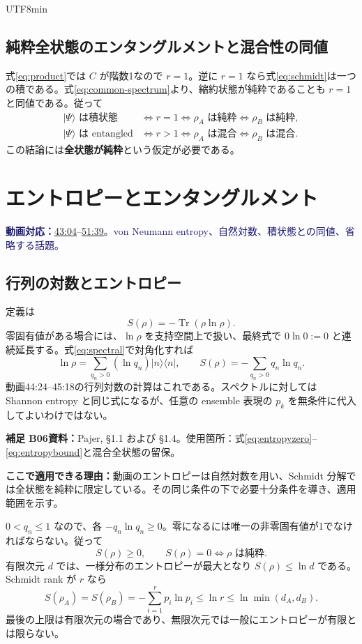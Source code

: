 \documentclass[11pt,a4paper]{article}
\numberwithin{equation}{section}
\newcommand{\Tr}{\operatorname{Tr}}
\newcommand{\ket}[1]{\lvert#1\rangle}
\newcommand{\bra}[1]{\langle#1\rvert}
\newcommand{\vid}[2]{\href{https://www.youtube.com/watch?v=3gDSaNy1O7Y\&t=#1s}{#2}}
\newcommand{\source}[1]{\par\noindent\textcolor{MidnightBlue}{\textbf{動画対応：}#1}\par}
\newcommand{\supp}[3]{\par\smallskip\noindent\textcolor{BrickRed}{\textbf{補足 #1}}\quad\textbf{資料：}#2\par\noindent\textbf{ここで適用できる理由：}#3\par}
\begin{document}
\begin{CJK*}{UTF8}{min}
\subsection{純粋全状態のエンタングルメントと混合性の同値}
式\eqref{eq:product}では $C$ が階数1なので $r=1$。逆に $r=1$ なら式\eqref{eq:schmidt}は一つの積である。式\eqref{eq:common-spectrum}より、縮約状態が純粋であることも $r=1$ と同値である。従って
\begin{equation}
\begin{split}
\ket{\Psi}\text{ は積状態}
&\Longleftrightarrow r=1
\Longleftrightarrow\rho_A\text{ は純粋}
\Longleftrightarrow\rho_B\text{ は純粋},\\
\ket{\Psi}\text{ は entangled}
&\Longleftrightarrow r>1
\Longleftrightarrow\rho_A\text{ は混合}
\Longleftrightarrow\rho_B\text{ は混合}.
\end{split}
\label{eq:entmixed}
\end{equation}
この結論には\textbf{全状態が純粋}という仮定が必要である。

\section{エントロピーとエンタングルメント}
\label{sec:entropy}
\source{\vid{2584}{43:04}--\vid{3099}{51:39}。von Neumann entropy、自然対数、積状態との同値、省略する話題。}
\subsection{行列の対数とエントロピー}
定義は
\begin{equation}
S(\rho)=-\Tr(\rho\ln\rho).
\label{eq:vn}
\end{equation}
零固有値がある場合には、$\ln\rho$ を支持空間上で扱い、最終式で $0\ln0:=0$ と連続延長する。式\eqref{eq:spectral}で対角化すれば
\begin{equation}
\ln\rho=\sum_{q_n>0}(\ln q_n)\ket{n}\bra{n},
\qquad S(\rho)=-\sum_{q_n>0}q_n\ln q_n.
\label{eq:spectralentropy}
\end{equation}
動画44:24--45:18の行列対数の計算はこれである。スペクトルに対しては Shannon entropy と同じ式になるが、任意の ensemble 表現の $p_k$ を無条件に代入してよいわけではない。

\supp{B06}{Pajer\cite{pajer}, §1.1 および §1.4。使用箇所：式\eqref{eq:entropyzero}--\eqref{eq:entropybound}と混合全状態の留保。}{動画のエントロピーは自然対数を用い、Schmidt 分解では全状態を純粋に限定している。その同じ条件の下で必要十分条件を導き、適用範囲を示す。}
$0<q_n\leq1$ なので、各 $-q_n\ln q_n\geq0$。零になるには唯一の非零固有値が1でなければならない。従って
\begin{equation}
S(\rho)\geq0,\qquad
S(\rho)=0\Longleftrightarrow\rho\text{ は純粋}.
\label{eq:entropyzero}
\end{equation}
有限次元 $d$ では、一様分布のエントロピーが最大となり $S(\rho)\leq\ln d$ である。Schmidt rank が $r$ なら
\begin{equation}
S(\rho_A)=S(\rho_B)=-\sum_{i=1}^{r}p_i\ln p_i
\leq\ln r\leq\ln\min(d_A,d_B).
\label{eq:entropybound}
\end{equation}
最後の上限は有限次元の場合であり、無限次元では一般にエントロピーが有限とは限らない。


\end{CJK*}
\end{document}
